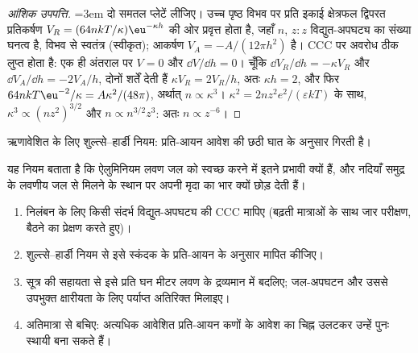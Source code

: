 \begin{proof}[आंशिक उपपत्ति]
\emergencystretch=3em दो समतल प्लेटें लीजिए। उच्च पृष्ठ विभव पर प्रति इकाई क्षेत्रफल द्विपरत प्रतिकर्षण
$V_R = (64nkT/\kappa)\eu^{-\kappa h}$ की ओर प्रवृत्त होता है, जहाँ $n$, $z{:}z$
विद्युत-अपघट्य का संख्या घनत्व है, विभव से स्वतंत्र (स्वीकृत); आकर्षण $V_A =
-A/(12\pi h^2)$ है। CCC पर अवरोध ठीक लुप्त होता है: एक ही अंतराल पर $V = 0$ और $\dd V/\dd h = 0$।
चूँकि $\dd V_R/\dd h = -\kappa V_R$ और $\dd V_A/\dd h = -2V_A/h$, दोनों शर्तें देती हैं
$\kappa V_R = 2V_R/h$, अतः $\kappa h = 2$, और फिर $64nkT\eu^{-2}/\kappa = A\kappa^2/(48\pi)$, अर्थात् $n \propto \kappa^3$।
$\kappa^2 = 2nz^2e^2/(\varepsilon kT)$ के साथ, $\kappa^3 \propto (nz^2)^{3/2}$ और $n \propto n^{3/2}z^3$: अतः $n \propto z^{-6}$।
\end{proof}

\begin{omfigure}

{\small ऋणावेशित  के लिए शुल्त्से--हार्डी नियम:  प्रति-आयन आवेश की छठी घात के अनुसार गिरती है।}
\end{omfigure}

यह नियम बताता है कि ऐलुमिनियम लवण जल को स्वच्छ करने में इतने प्रभावी क्यों हैं, और
नदियाँ समुद्र के लवणीय जल से मिलने के स्थान पर अपनी मृदा का भार क्यों छोड़ देती हैं।

\begin{method}[स्कंदक मात्रा का चयन]\label{met:b3:colloids:coagulant-dose}
\begin{enumerate}
  \item निलंबन के लिए किसी संदर्भ विद्युत-अपघट्य की CCC मापिए (बढ़ती मात्राओं के साथ
        जार परीक्षण, बैठने का प्रेक्षण करते हुए)।
  \item शुल्त्से--हार्डी नियम से इसे स्कंदक के प्रति-आयन के अनुसार मापित कीजिए।
  \item सूत्र की सहायता से इसे प्रति घन मीटर लवण के द्रव्यमान में बदलिए; जल-अपघटन
        और उससे उपभुक्त क्षारीयता के लिए पर्याप्त अतिरिक्त मिलाइए।
  \item अतिमात्रा से बचिए: अत्यधिक आवेशित प्रति-आयन कणों के आवेश का चिह्न
        उलटकर उन्हें पुनः स्थायी बना सकते हैं।
\end{enumerate}
\end{method}

